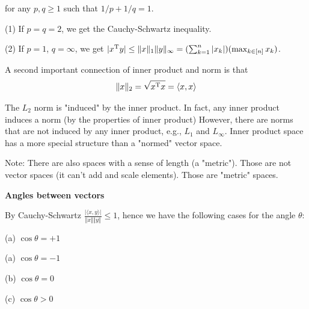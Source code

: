 for any $p, q\geq 1$ such that $1/p+1/q=1$.

(1) If $p=q=2$, we get the Cauchy-Schwartz inequality.

(2) If $p=1$, $q=\infty$, we get $\vert x^{{\rm T}}y\vert\leq \Vert x\Vert_{1}\Vert y\Vert_{\infty}=(\sum_{k=1}^{n}\vert x_{k}\vert)(\max_{k\in [n]}x_{k})$.


\vspace{0.5cm}
A second important connection of inner product and norm is that
$$\Vert x\Vert_{2}=\sqrt{x^{{\rm T}} x}=\langle x,x\rangle$$

The $L_{2}$ norm is "induced" by the inner product. In fact, any inner product induces a norm (by the properties of inner product) However, there are norms that are not induced by any inner product, e.g., $L_{1}$ and $L_{\infty}$. Inner product space has a more special structure than a "normed" vector space.

\begin{figure}
	\centering
	\resizebox{7.5cm}{3cm}{}
	\caption{}
	\label{}
\end{figure}

Note: There are also spaces with a sense of length (a "metric"). Those are not vector spaces (it can't add and scale elements). Those are "metric" spaces.

\vspace{0.5cm}
\noindent\textbf{Angles between vectors}

By Cauchy-Schwartz $\frac{\vert \langle x,y\rangle\vert}{\Vert x\Vert \Vert y\Vert}\leq 1$, hence we have the following cases for the angle $\theta$:

\begin{marginfigure}
	\centering
	\resizebox{7.5cm}{3cm}{}
	\caption{(a) $\cos\theta = +1$}
	\label{}
\end{marginfigure}

\begin{marginfigure}
	\centering
	\resizebox{7.5cm}{3cm}{}
	\caption{(a) $\cos\theta = -1$}
	\label{}
\end{marginfigure}

\begin{marginfigure}
	\centering
	\resizebox{7.5cm}{3cm}{}
	\caption{(b) $\cos\theta = 0$}
	\label{}
\end{marginfigure}

\begin{marginfigure}
	\centering
	\resizebox{7.5cm}{3cm}{}
	\caption{(c) $\cos\theta>0$}
	\label{}
\end{marginfigure}

